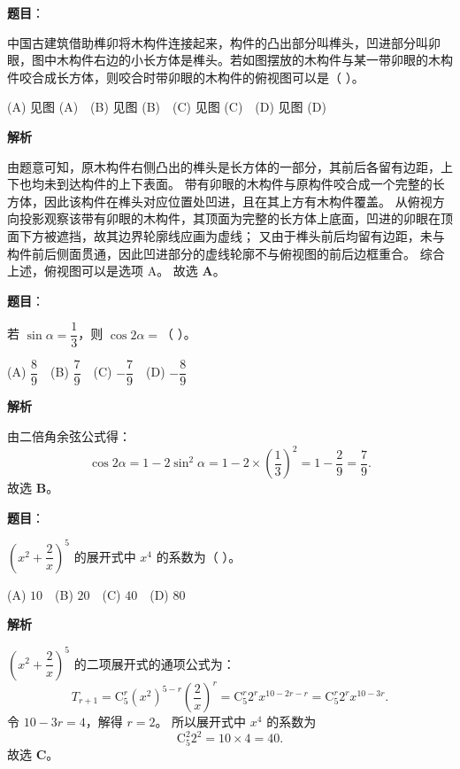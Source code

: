 \begin{answer}

\textbf{题目}：

中国古建筑借助榫卯将木构件连接起来，构件的凸出部分叫榫头，凹进部分叫卯眼，图中木构件右边的小长方体是榫头。若如图摆放的木构件与某一带卯眼的木构件咬合成长方体，则咬合时带卯眼的木构件的俯视图可以是（ ）。
\nopagebreak[4]
\begin{center}\end{center}
\nopagebreak[4]
(A) 见图 (A)　(B) 见图 (B)　(C) 见图 (C)　(D) 见图 (D)

\textbf{解析}

由题意可知，原木构件右侧凸出的榫头是长方体的一部分，其前后各留有边距，上下也均未到达构件的上下表面。
带有卯眼的木构件与原构件咬合成一个完整的长方体，因此该构件在榫头对应位置处凹进，且在其上方有木构件覆盖。
从俯视方向投影观察该带有卯眼的木构件，其顶面为完整的长方体上底面，凹进的卯眼在顶面下方被遮挡，故其边界轮廓线应画为虚线；
又由于榫头前后均留有边距，未与构件前后侧面贯通，因此凹进部分的虚线轮廓不与俯视图的前后边框重合。
综合上述，俯视图可以是选项 A。
故选 \textbf{A}。


\end{answer}
\begin{answer}

\textbf{题目}：

若 $\sin\alpha = \dfrac13$，则 $\cos 2\alpha =$（ ）。

(A) $\dfrac89$　(B) $\dfrac79$　(C) $-\dfrac79$　(D) $-\dfrac89$

\textbf{解析}

由二倍角余弦公式得：
\nopagebreak[4]
\[\cos 2\alpha = 1 - 2\sin^2\alpha = 1 - 2\times \left(\dfrac13\right)^2 = 1 - \dfrac29 = \dfrac79.\]
故选 \textbf{B}。


\end{answer}
\begin{answer}

\textbf{题目}：

$\left(x^2 + \dfrac2x\right)^5$ 的展开式中 $x^4$ 的系数为（ ）。

(A) $10$　(B) $20$　(C) $40$　(D) $80$

\textbf{解析}

$\left(x^2 + \dfrac2x\right)^5$ 的二项展开式的通项公式为：
\nopagebreak[4]
\[T_{r+1} = \mathrm C_5^r (x^2)^{5-r} \left(\dfrac2x\right)^r = \mathrm C_5^r 2^r x^{10 - 2r - r} = \mathrm C_5^r 2^r x^{10 - 3r}.\]
令 $10 - 3r = 4$，解得 $r = 2$。
所以展开式中 $x^4$ 的系数为
\nopagebreak[4]
\[\mathrm C_5^2 2^2 = 10 \times 4 = 40.\]
故选 \textbf{C}。


\end{answer}
